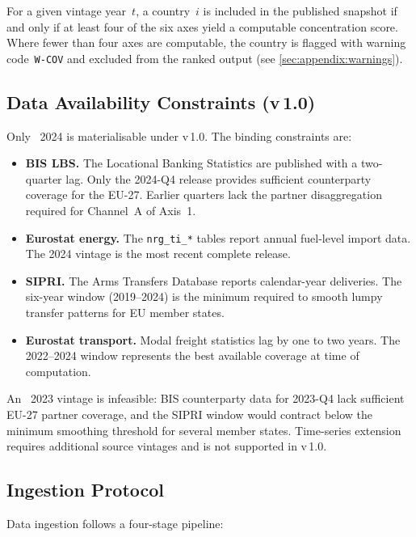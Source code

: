 For a given vintage year~\(t\), a country~\(i\) is included in the published
snapshot if and only if at least four of the six axes yield a computable
concentration score.  Where fewer than four axes are computable, the country is
flagged with warning code~\texttt{W-COV} and excluded from the ranked output
(see \cref{sec:appendix:warnings}).

\subsection{Data Availability Constraints (v\,1.0)}\label{sec:data:constraints}

Only {\ISI}~2024 is materialisable under v\,1.0.  The binding constraints are:

\begin{itemize}
  \item \textbf{BIS LBS.}  The Locational Banking Statistics are published
    with a two-quarter lag.  Only the 2024-Q4 release provides sufficient
    counterparty coverage for the EU-27.  Earlier quarters lack the partner
    disaggregation required for Channel~A of Axis~1.
  \item \textbf{Eurostat energy.}  The \texttt{nrg\_ti\_*} tables report
    annual fuel-level import data.  The 2024 vintage is the most recent
    complete release.
  \item \textbf{SIPRI.}  The Arms Transfers Database reports calendar-year
    deliveries.  The six-year window (2019--2024) is the minimum required
    to smooth lumpy transfer patterns for EU member states.
  \item \textbf{Eurostat transport.}  Modal freight statistics lag by one to
    two years.  The 2022--2024 window represents the best available coverage
    at time of computation.
\end{itemize}

An {\ISI}~2023 vintage is infeasible: BIS counterparty data for 2023-Q4 lack
sufficient EU-27 partner coverage, and the SIPRI window would contract below
the minimum smoothing threshold for several member states.  Time-series
extension requires additional source vintages and is not supported in v\,1.0.

\subsection{Ingestion Protocol}\label{sec:data:ingestion}

Data ingestion follows a four-stage pipeline:


